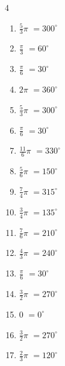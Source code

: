 \begin{multicols}{4}
\begin{enumerate}
  \item $\displaystyle \frac{5}{3}\pi$
        $\displaystyle =300^{\circ}$

  \item $\displaystyle \frac{\pi}{3}$
        $\displaystyle =60^{\circ}$

  \item $\displaystyle \frac{\pi}{6}$
        $\displaystyle =30^{\circ}$

  \item $\displaystyle 2\pi$
        $\displaystyle =360^{\circ}$

  \item $\displaystyle \frac{5}{3}\pi$
        $\displaystyle =300^{\circ}$

  \item $\displaystyle \frac{\pi}{6}$
        $\displaystyle =30^{\circ}$

  \item $\displaystyle \frac{11}{6}\pi$
        $\displaystyle =330^{\circ}$

  \item $\displaystyle \frac{5}{6}\pi$
        $\displaystyle =150^{\circ}$

  \item $\displaystyle \frac{7}{4}\pi$
        $\displaystyle =315^{\circ}$

  \item $\displaystyle \frac{3}{4}\pi$
        $\displaystyle =135^{\circ}$

  \item $\displaystyle \frac{7}{6}\pi$
        $\displaystyle =210^{\circ}$

  \item $\displaystyle \frac{4}{3}\pi$
        $\displaystyle =240^{\circ}$

\columnbreak %

\resetques

  \item $\displaystyle \frac{\pi}{6}$
        $\displaystyle =30^{\circ}$

  \item $\displaystyle \frac{3}{2}\pi$
        $\displaystyle =270^{\circ}$

  \item $\displaystyle 0$
        $\displaystyle =0^{\circ}$

  \item $\displaystyle \frac{3}{2}\pi$
        $\displaystyle =270^{\circ}$

  \item $\displaystyle \frac{2}{3}\pi$
        $\displaystyle =120^{\circ}$


\end{enumerate}
\end{multicols}
